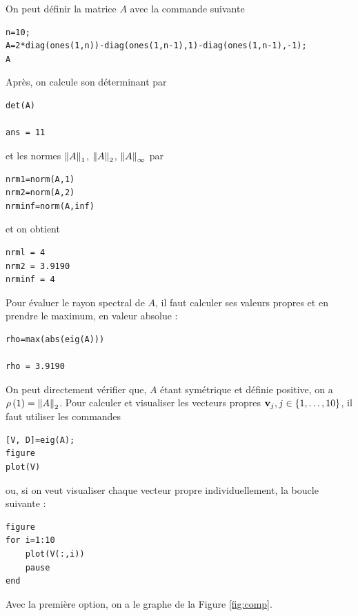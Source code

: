 On peut définir la matrice $A$ avec la commande suivante

\begin{verbatim}
n=10;
A=2*diag(ones(1,n))-diag(ones(1,n-1),1)-diag(ones(1,n-1),-1);
A
\end{verbatim}

Après, on calcule son déterminant par

\begin{verbatim}
det(A)

ans = 11
\end{verbatim}

et les normes $\left\lVert A\right\rVert_{1}$, $\left\lVert A\right\rVert_{2}$, $\left\lVert A\right\rVert_{\infty}$ par

\begin{verbatim}
nrm1=norm(A,1)
nrm2=norm(A,2)
nrminf=norm(A,inf)
\end{verbatim}

et on obtient

\begin{verbatim}
nrml = 4
nrm2 = 3.9190
nrminf = 4
\end{verbatim}


Pour évaluer le rayon spectral de $A$, il faut calculer ses valeurs propres et en prendre le maximum, en valeur absolue :
 
\begin{verbatim}
rho=max(abs(eig(A)))

rho = 3.9190
\end{verbatim}
 
On peut directement vérifier que, $A$ étant symétrique et définie positive, on a $\rho \left(1\right) = \left\lVert A\right\rVert_{2}$.
Pour calculer et visualiser les vecteurs propres $\mathbf{v}_{j}, j \in \left\{1, \dots, 10\right\}$, il faut utiliser les commandes

\begin{verbatim}
[V, D]=eig(A);
figure
plot(V)
\end{verbatim}


ou, si on veut visualiser chaque vecteur propre individuellement, la boucle suivante :
 
\begin{verbatim}
figure
for i=1:10
    plot(V(:,i))
    pause
end
\end{verbatim}

Avec la première option, on a le graphe de la Figure \ref{fig:comp}.

